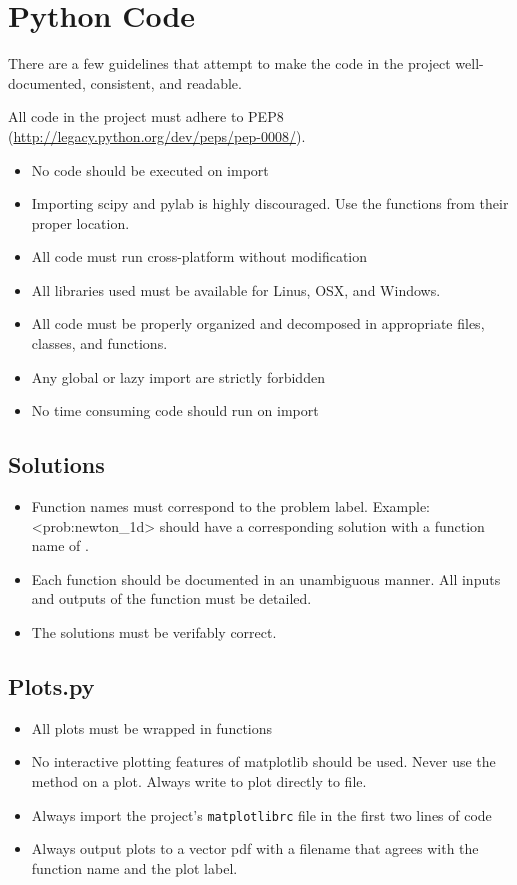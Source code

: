 \section{Python Code}
There are a few guidelines that attempt to make the code in the project well-documented, consistent, and readable.

All code in the project must adhere to PEP8 (\url{http://legacy.python.org/dev/peps/pep-0008/}).

\begin{itemize}
\item No code should be executed on import
\item Importing scipy and pylab is highly discouraged.  Use the functions from their proper location.
\item All code must run cross-platform without modification
\item All libraries used must be available for Linus, OSX, and Windows.
\item All code must be properly organized and decomposed in appropriate files, classes, and functions.
\item Any global or lazy import are strictly forbidden
\item No time consuming code should run on import
\end{itemize}

\subsection{Solutions}
\begin{itemize}
\item Function names must correspond to the problem label.  Example: <prob:newton_1d> should have a corresponding solution with a function name of .
\item Each function should be documented in an unambiguous manner.  All inputs and outputs of the function must be detailed.
\item The solutions must be verifably correct.
\end{itemize}

\subsection{Plots.py}
\begin{itemize}
\item All plots must be wrapped in functions
\item No interactive plotting features of matplotlib should be used.  Never use the  method on a plot.  Always write to plot directly to file.
\item Always import the project's \texttt{matplotlibrc} file in the first two lines of code
\item Always output plots to a vector pdf with a filename that agrees with the function name and the plot label.
\end{itemize}



